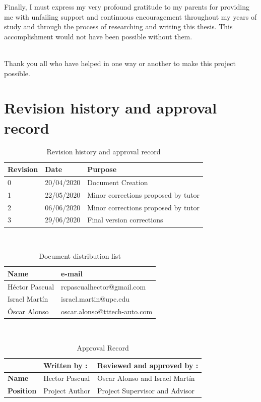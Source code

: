 \documentclass{article}
\begin{document}
Finally, I must express my very profound gratitude to my parents for providing me with unfailing support and continuous encouragement throughout my years of study and through the process of researching and writing this thesis. This accomplishment would not have been possible without them. 
\\~

Thank you all who have helped in one way or another to make this project possible.

\newpage
\section*{Revision history and approval record}
\vspace{0.5cm}
\begin{table}[!h]
\begin{tabularx}{\textwidth}{|l|l|X|}
\hline
\textbf{Revision} & \textbf{Date} & \textbf{Purpose} \\ \hline
0                 & 20/04/2020    & Document Creation \\ \hline
1                 & 22/05/2020    & Minor corrections proposed by tutor \\ \hline
2                 & 06/06/2020    & Minor corrections proposed by tutor \\ \hline
3                 & 29/06/2020    & Final version corrections \\ \hline

\end{tabularx}
\caption{Revision history and approval record}
\end{table}
~\\
\begin{table}[!h]
\begin{tabularx}{\textwidth}{|l|X|}
\hline
\textbf{Name} & \textbf{e-mail} \\ \hline
Héctor Pascual & rcpascualhector@gmail.com \\ \hline
Israel Martín & israel.martin@upc.edu \\ \hline
Óscar Alonso &  oscar.alonso@tttech-auto.com \\ \hline
\end{tabularx}
\caption{Document distribution list}
\end{table}
~\\
\begin{table}[!h]
\begin{tabularx}{\textwidth}{|l|l|X|}
\hline
 & \textbf{Written by : } & \textbf{Reviewed and approved by :} \\ \hline
\textbf{Name}                & Hector Pascual    & Oscar Alonso and Israel Martín \\ \hline
\textbf{Position}            & Project Author    & Project Supervisor and Advisor \\ \hline

\end{tabularx}
\caption{Approval Record}
\end{table}
\newpage
\end{document}

